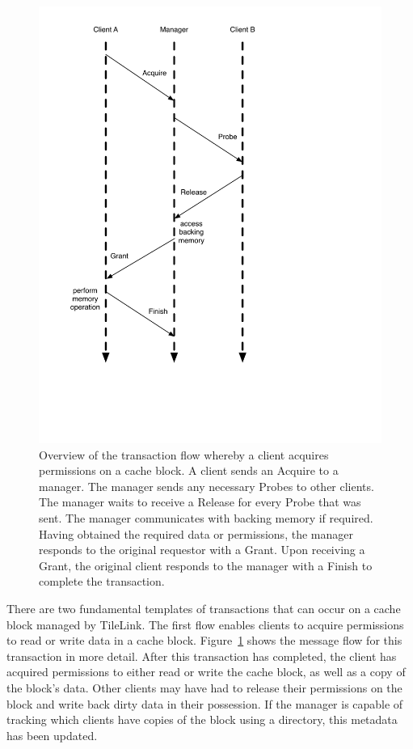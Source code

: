 \begin{figure}[t!]
\centering
\includegraphics[width=0.6\columnwidth]{tilelink/figures/standard3.pdf}
\caption[Transaction flow to Acquire permissions on a cache block.]{
Overview of the transaction flow whereby a client acquires permissions on a cache block.
A client sends an Acquire to a manager.
The manager sends any necessary Probes to other clients.
The manager waits to receive a Release for every Probe that was sent.
The manager communicates with backing memory if required.
Having obtained the required data or permissions, the manager responds to the original requestor with a Grant.
Upon receiving a Grant, the original client responds to the manager with a Finish to complete the transaction.
}
\label{fig:standard3}
\end{figure}

There are two fundamental templates of transactions that can occur on a cache block managed by TileLink.
The first flow enables clients to acquire permissions to read or write data in a cache block.
Figure~\ref{fig:standard3} shows the message flow for this transaction in more detail.
After this transaction has completed, the client has acquired permissions to either read or write the cache block, as well as a copy of the block's data.
Other clients may have had to release their permissions on the block and write back dirty data in their possession.
If the manager is capable of tracking which clients have copies of the block using a directory, this metadata has been updated.

